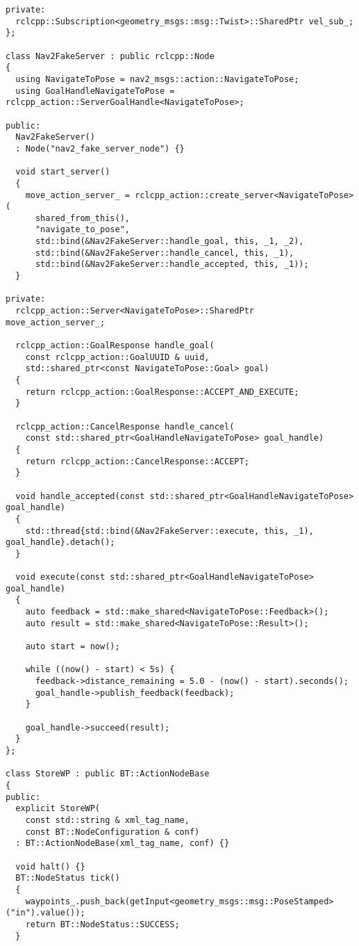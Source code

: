 \begin{tcolorbox}[sharp corners, colframe=gray!80, colback=LightGray, left=0pt, top=0pt, bottom=0pt, title=\texttt{br2\_bt\_patrolling/tests/bt\_action\_test.cpp}]
\begin{verbatim}
private:
  rclcpp::Subscription<geometry_msgs::msg::Twist>::SharedPtr vel_sub_;
};

class Nav2FakeServer : public rclcpp::Node
{
  using NavigateToPose = nav2_msgs::action::NavigateToPose;
  using GoalHandleNavigateToPose = rclcpp_action::ServerGoalHandle<NavigateToPose>;

public:
  Nav2FakeServer()
  : Node("nav2_fake_server_node") {}

  void start_server()
  {
    move_action_server_ = rclcpp_action::create_server<NavigateToPose>(
      shared_from_this(),
      "navigate_to_pose",
      std::bind(&Nav2FakeServer::handle_goal, this, _1, _2),
      std::bind(&Nav2FakeServer::handle_cancel, this, _1),
      std::bind(&Nav2FakeServer::handle_accepted, this, _1));
  }

private:
  rclcpp_action::Server<NavigateToPose>::SharedPtr move_action_server_;

  rclcpp_action::GoalResponse handle_goal(
    const rclcpp_action::GoalUUID & uuid,
    std::shared_ptr<const NavigateToPose::Goal> goal)
  {
    return rclcpp_action::GoalResponse::ACCEPT_AND_EXECUTE;
  }

  rclcpp_action::CancelResponse handle_cancel(
    const std::shared_ptr<GoalHandleNavigateToPose> goal_handle)
  {
    return rclcpp_action::CancelResponse::ACCEPT;
  }

  void handle_accepted(const std::shared_ptr<GoalHandleNavigateToPose> goal_handle)
  {
    std::thread{std::bind(&Nav2FakeServer::execute, this, _1), goal_handle}.detach();
  }

  void execute(const std::shared_ptr<GoalHandleNavigateToPose> goal_handle)
  {
    auto feedback = std::make_shared<NavigateToPose::Feedback>();
    auto result = std::make_shared<NavigateToPose::Result>();

    auto start = now();

    while ((now() - start) < 5s) {
      feedback->distance_remaining = 5.0 - (now() - start).seconds();
      goal_handle->publish_feedback(feedback);
    }

    goal_handle->succeed(result);
  }
};

class StoreWP : public BT::ActionNodeBase
{
public:
  explicit StoreWP(
    const std::string & xml_tag_name,
    const BT::NodeConfiguration & conf)
  : BT::ActionNodeBase(xml_tag_name, conf) {}

  void halt() {}
  BT::NodeStatus tick()
  {
    waypoints_.push_back(getInput<geometry_msgs::msg::PoseStamped>("in").value());
    return BT::NodeStatus::SUCCESS;
  }


\end{verbatim}
\end{tcolorbox}
